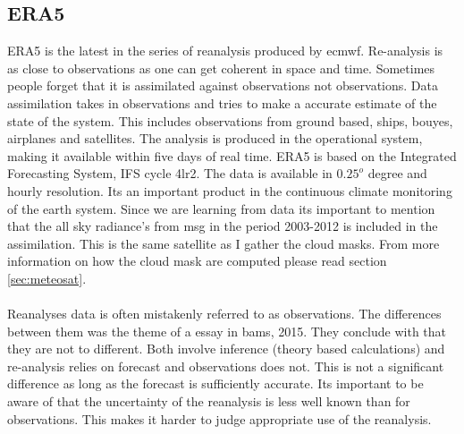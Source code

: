 \subsection{ERA5} \label{sec:era5}
ERA5 is the latest in the series of reanalysis produced by \acrfull{ecmwf}. Re-analysis is as close to observations as one can get coherent in space and time. Sometimes people forget that it is assimilated against observations not observations. Data assimilation takes in observations and tries to make a accurate estimate of the state of the system. This includes observations from ground based, ships, bouyes, airplanes and satellites. The analysis is produced in the operational system, making it available within five days of real time. ERA5 is based on the Integrated Forecasting System, IFS cycle 4lr2. The data is available in $0.25^o$ degree and hourly resolution. Its an important product in the continuous climate monitoring of the earth system. Since we are learning from data its important to mention that the all sky radiance's from \acrfull{msg} in the period 2003-2012 is included in the assimilation. This is the same satellite as I gather the cloud masks. From more information on how the cloud mask are computed please read section \ref{sec:meteosat}.
\\ \\ 
Reanalyses data is often mistakenly referred to as observations. The differences between them was the theme of a essay in \acrfull{bams}, 2015. They conclude with that they are not to different. Both involve inference (theory based calculations) and re-analysis relies on forecast and observations does not. This is not a significant difference as long as the forecast is sufficiently accurate. Its important to be aware of that the uncertainty of the reanalysis is less well known than for observations. This makes it harder to judge appropriate use of the reanalysis.  

